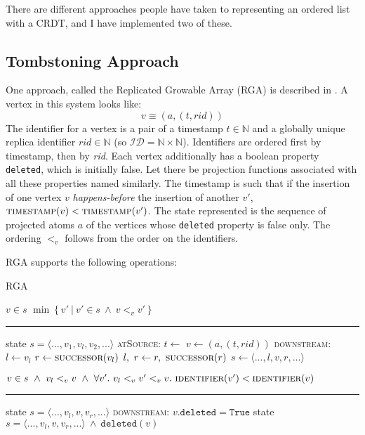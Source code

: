 \documentclass[diss.tex]{subfiles}
\begin{document}
There are different approaches people have taken to representing an ordered list with a CRDT, and I have implemented two of these.
%
%

%
\subsection{Tombstoning Approach}
One approach, called the Replicated Growable Array (RGA) is described in \cite{shapstudy}. A vertex in this system looks like:
$$ v \equiv (a, (t, rid))$$
 The identifier for a vertex is a pair of a timestamp $t \in \mathbb{N}$ and a globally unique replica identifier $rid \in \mathbb{N}$ (so $\mathcal{ID} = \mathbb{N} \times \mathbb{N}$). Identifiers are ordered first by timestamp, then by \textit{rid}. Each vertex additionally has a boolean property \texttt{deleted}, which is initially false. Let there be projection functions associated with all these properties named similarly. The timestamp is such that if the insertion of one vertex $v$ \textit{happens-before} the insertion of another $v'$, $\textsc{timestamp}(v) < \textsc{timestamp}(v')$.
The state represented is the sequence of projected atoms $a$ of the vertices whose \texttt{deleted} property is false only. The ordering $<_v$ follows from the order on the identifiers.

\noindent
RGA supports the following operations:
\begin{algorithm}[H]
\caption*{RGA}
\begin{algorithmic}[1]
\Require $v \in s$
\State \Return $\min \left\{ v' ~|~ v' \in s ~\wedge~ v <_v v'  \right\}$
\EndFunction
\end{algorithmic}

\hrule

\begin{algorithmic}[1]
\Require state $s = \langle ..., v_1, v_l, v_2, ...\rangle$
\BState \textsc{atSource}:
\State $t \gets$  
\State $v \gets (a,(t, rid))$
\BState \textsc{downstream}:
\State $l \gets v_l$
\State $r \gets \Call{successor}{v_l}$
\State $l,~r \gets r, ~\Call{successor}{r}$
\EndWhile
\State $s \gets \langle ..., l, v, r, ...\rangle$
\EndFunction

\Ensure $v \in s ~\wedge~ v_l <_v v ~\wedge~ \forall v'.~ v_l<_v v'<_v v. ~\textsc{identifier}(v') < \textsc{identifier}(v)$
\end{algorithmic}

\hrule

\begin{algorithmic}[1]
\Require state $s = \langle ..., v_l, v, v_r, ... \rangle$
\BState \textsc{downstream}:
\State $v.\mathtt{deleted} = \mathtt{True}$
\EndFunction
\Ensure state $s = \langle ..., v_l, v, v_r, ... \rangle ~\wedge~ \mathtt{deleted}(v)$
\end{algorithmic}
\end{algorithm}
\end{document}
